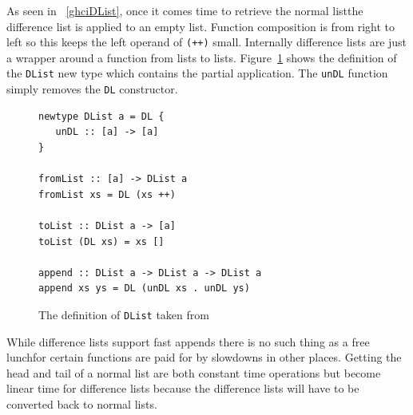 As seen in \DIFdelbegin {}\DIFdelend \DIFaddbegin {}\DIFaddend ~\ref{ghciDList}, once it comes time to retrieve the normal list\DIFaddbegin \DIFadd{, }\DIFaddend the difference list is applied to an empty list. Function composition is \DIFdelbegin {}\DIFdelend \DIFaddbegin {}\DIFaddend from right to left so this keeps the left operand of \texttt{(++)} small. Internally difference lists are just a wrapper around a function from lists to lists. Figure~\ref{dlistDef} shows the definition of the \texttt{DList} new type which contains the partial application. The \texttt{unDL} function simply removes the \texttt{DL} constructor. 

\begin{figure}[t]
\begin{lstlisting}
newtype DList a = DL {
   unDL :: [a] -> [a]
}

fromList :: [a] -> DList a
fromList xs = DL (xs ++)

toList :: DList a -> [a]
toList (DL xs) = xs []

append :: DList a -> DList a -> DList a
append xs ys = DL (unDL xs . unDL ys)
\end{lstlisting}
\caption{The definition of \texttt{DList} taken from~\citep{realWorldHaskell}}
\label{dlistDef}
\end{figure}

While difference lists support fast appends there is no such thing as a free lunch\DIFdelbegin {}\DIFdelend \DIFaddbegin {}\DIFaddend for certain functions are paid for by slowdowns in other places. Getting the head and tail of a normal list are both constant time operations but become linear time for difference lists because the difference lists will have to be converted back to normal lists. 


\DIFdelbegin %


